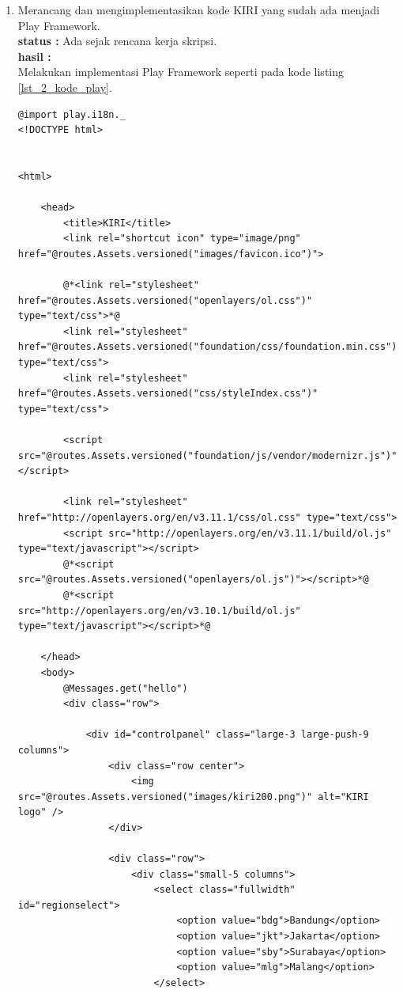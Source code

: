 \documentclass[a4paper,twoside]{article}
\begin{document}
\begin{enumerate}
    \item Merancang dan mengimplementasikan kode KIRI yang sudah ada menjadi Play Framework.\\
    {\bf status :} Ada sejak rencana kerja skripsi.\\
    {\bf hasil :}    \\
    Melakukan implementasi Play Framework seperti pada kode listing \ref{lst_2_kode_play}.
    \begin{lstlisting}[caption=Template \textit{view} pada Play Framework,label = {lst_2_kode_play}]
@import play.i18n._
<!DOCTYPE html>


<html>

    <head>
        <title>KIRI</title>
        <link rel="shortcut icon" type="image/png" href="@routes.Assets.versioned("images/favicon.ico")">

        @*<link rel="stylesheet" href="@routes.Assets.versioned("openlayers/ol.css")" type="text/css">*@
        <link rel="stylesheet" href="@routes.Assets.versioned("foundation/css/foundation.min.css")" type="text/css">
        <link rel="stylesheet" href="@routes.Assets.versioned("css/styleIndex.css")" type="text/css">

        <script src="@routes.Assets.versioned("foundation/js/vendor/modernizr.js")"></script>

        <link rel="stylesheet" href="http://openlayers.org/en/v3.11.1/css/ol.css" type="text/css">
        <script src="http://openlayers.org/en/v3.11.1/build/ol.js" type="text/javascript"></script>
        @*<script src="@routes.Assets.versioned("openlayers/ol.js")"></script>*@
        @*<script src="http://openlayers.org/en/v3.10.1/build/ol.js" type="text/javascript"></script>*@

    </head>
    <body>
        @Messages.get("hello")
        <div class="row">

            <div id="controlpanel" class="large-3 large-push-9 columns">
                <div class="row center">
                    <img src="@routes.Assets.versioned("images/kiri200.png")" alt="KIRI logo" />
                </div>

                <div class="row">
                    <div class="small-5 columns">
                        <select class="fullwidth" id="regionselect">
                            <option value="bdg">Bandung</option>
                            <option value="jkt">Jakarta</option>
                            <option value="sby">Surabaya</option>
                            <option value="mlg">Malang</option>
                        </select>


\end{lstlisting}
\end{enumerate}
\end{document}
